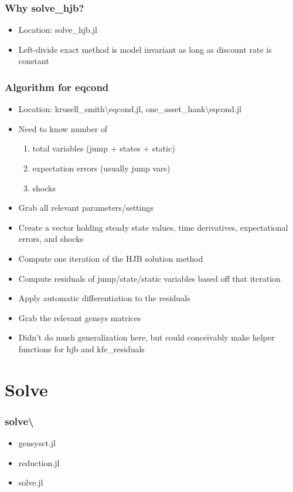 \documentclass{beamer}
\begin{document}
\begin{frame}
  \frametitle{Why solve\_hjb?}
  \begin{itemize}
  \item Location: solve\_hjb.jl
  \item Left-divide exact method is model invariant as long as discount rate is constant
  \end{itemize}
\end{frame}
\begin{frame}
\frametitle{Algorithm for eqcond}
\begin{itemize}
\item Location: krusell\_smith\textbackslash eqcond.jl, one\_asset\_hank\textbackslash eqcond.jl
\item Need to know number of
  \begin{enumerate}
  \item total variables (jump + states + static)
  \item expectation errors (usually jump vars)
  \item shocks
  \end{enumerate}
\item Grab all relevant parameters/settings
\item Create a vector holding steady state values, time derivatives, expectational errors, and shocks
\item Compute one iteration of the HJB solution method
\item Compute residuals of jump/state/static variables based off that iteration
\item Apply automatic differentiation to the residuals
\item Grab the relevant gensys matrices
\item Didn't do much generalization here, but could conceivably make helper functions for hjb and kfe\_residuals
\end{itemize}
\end{frame}

\section{Solve}

\begin{frame}
  \frametitle{solve\textbackslash}
   \begin{itemize}
    \item gensysct.jl
    \item reduction.jl
    \item solve.jl
  \end{itemize}
\end{frame}
\end{document}
